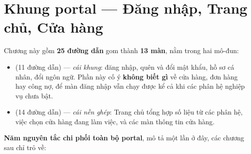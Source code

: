 \chapter{Khung portal --- Đăng nhập, Trang chủ, Cửa hàng}

Chương này gồm \textbf{25 đường dẫn} gom thành \textbf{13 màn}, nằm trong hai mô-đun:

\begin{itemize}[leftmargin=*,itemsep=1pt]
  \item {} (11 đường dẫn) --- \emph{cái khung}: đăng nhập, quên và đổi
        mật khẩu, hồ sơ cá nhân, đổi ngôn ngữ. Phần này cố ý \textbf{không biết gì} về cửa
        hàng, đơn hàng hay công nợ, để màn đăng nhập vẫn chạy được kể cả khi các phân hệ
        nghiệp vụ chưa bật.
  \item {} (14 đường dẫn) --- \emph{cái nền ghép}: Trang chủ tổng hợp số
        liệu từ các phân hệ, việc chọn cửa hàng đang làm việc, và các màn thông tin cửa hàng.
\end{itemize}

\textbf{Năm nguyên tắc chi phối toàn bộ portal}, mô tả một lần ở đây, các chương sau chỉ trỏ về:


